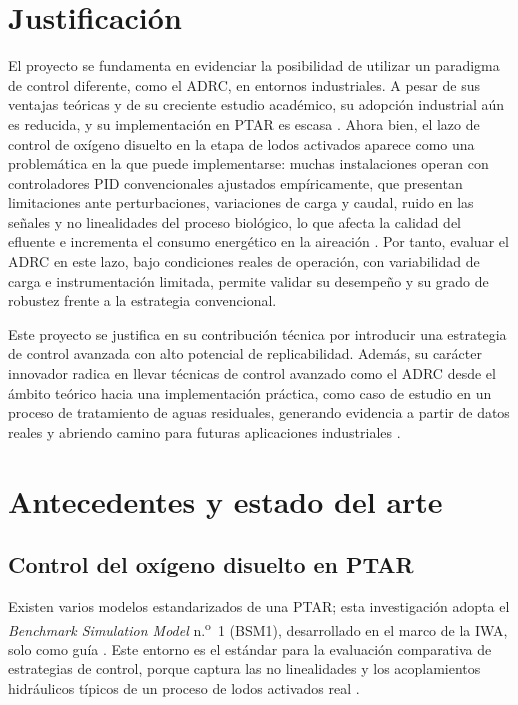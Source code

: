 \section{Justificación}
\label{sec:justificacion}

El proyecto se fundamenta en evidenciar la posibilidad de utilizar un
paradigma de control diferente, como el ADRC, en entornos industriales. A pesar
de sus ventajas teóricas y de su creciente estudio académico, su adopción
industrial aún es reducida, y su implementación en PTAR es escasa
\cite{Wei2020b,wei2022scalable,Sangregorio2023}. Ahora bien, el lazo de control
de oxígeno disuelto en la etapa de lodos activados aparece como una
problemática en la que puede implementarse: muchas instalaciones operan con
controladores PID convencionales ajustados empíricamente, que presentan
limitaciones ante perturbaciones, variaciones de carga y caudal, ruido en las
señales y no linealidades del proceso biológico, lo que afecta la calidad del
efluente e incrementa el consumo energético en la aireación
\cite{khalid2018review,shen2009mpc,qiao2018adaptive}. Por tanto, evaluar el
ADRC en este lazo, bajo condiciones reales de operación, con variabilidad de
carga e instrumentación limitada, permite validar su desempeño y su grado de
robustez frente a la estrategia convencional.

Este proyecto se justifica en su contribución técnica por introducir una estrategia de
control avanzada con alto potencial de replicabilidad. Además, su
carácter innovador radica en llevar técnicas de control avanzado como el ADRC
desde el ámbito teórico hacia una implementación práctica, como caso de
estudio en un proceso de tratamiento de aguas residuales, generando evidencia a
partir de datos reales y abriendo camino para futuras aplicaciones
industriales \cite{amand2013review,santin2016advanced}.

\section{Antecedentes y estado del arte}
\label{sec:estado_arte}

\subsection{Control del oxígeno disuelto en PTAR}

Existen varios modelos estandarizados de una PTAR; esta investigación adopta
el \textit{Benchmark Simulation Model} n.\textsuperscript{o}~1 (BSM1),
desarrollado en el marco de la IWA, solo como guía
\cite{copp2002bsm1,alex2008bsm1}. Este entorno es el estándar para la
evaluación comparativa de estrategias de control, porque captura las no
linealidades y los acoplamientos hidráulicos típicos de un proceso de lodos
activados real \cite{wei2020disturbance}.

